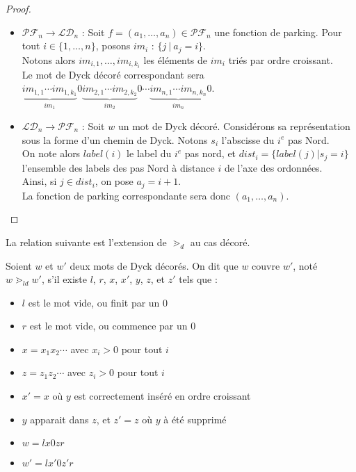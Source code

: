 \begin{proof}
    ~\
    \begin{itemize}
        \item $\mathcal{PF}_n \to \mathcal{LD}_n$ :
        Soit $f = (a_1, \ldots, a_n) \in \mathcal{PF}_n$ une fonction de
        parking. Pour tout $i \in \{1, \ldots, n\}$, posons $im_i$ :
        $\{j\ |\ a_j = i\}$. \\
        Notons alors $im_{i,1}, \ldots, im_{i,k_i}$ les éléments de $im_i$
        triés par ordre croissant.\\
        Le mot de Dyck décoré correspondant sera 
        $\underbrace{im_{1,1} \cdots im_{1,k_1}}_{im_1}0
         \underbrace{im_{2,1} \cdots im_{2,k_2}}_{im_2}0
         \cdots
         \underbrace{im_{n,1} \cdots im_{n,k_n}}_{im_n}0$.

        \item $\mathcal{LD}_n \to \mathcal{PF}_n$ :
        Soit $w$ un mot de Dyck décoré. Considérons sa représentation sous
        la forme d'un chemin de Dyck. Notons $s_i$ l'abscisse du $i^{e}$ pas
        Nord.\\
        On note alors $label(i)$ le label du $i^{e}$ pas nord, et
        $dist_i = \{label(j) | s_j = i\}$ l'ensemble  des labels des pas
        Nord à distance $i$ de l'axe des ordonnées.\\
        Ainsi, si $j \in dist_i$, on pose $a_j = i + 1$.\\
        La fonction de parking correspondante sera donc $(a_1, \ldots, a_n)$.
    \end{itemize}
\end{proof}

La relation suivante est l'extension de $\gtrdot_d$ au cas décoré.

\begin{definition}[$\gtrdot_{ld}$]
    Soient $w$ et $w'$ deux mots de Dyck décorés. On dit que $w$ couvre
    $w'$, noté $w \gtrdot_{ld} w'$, s'il existe $l$, $r$, $x$, $x'$, $y$,
    $z$, et $z'$ tels que :
    \begin{itemize}
        \item $l$ est le mot vide, ou finit par un $0$
        \item $r$ est le mot vide, ou commence par un $0$
        \item $x = x_1x_2 \cdots$ avec $x_i > 0$ pour tout $i$
        \item $z = z_1z_2 \cdots$ avec $z_i > 0$ pour tout $i$
        \item $x' = x$ où $y$ est correctement inséré en ordre croissant
        \item $y$ apparait dans $z$, et $z' = z$ où $y$ à été supprimé
        \item $w = lx0zr$
        \item $w' = lx'0z'r$
    \end{itemize}  
\end{definition}